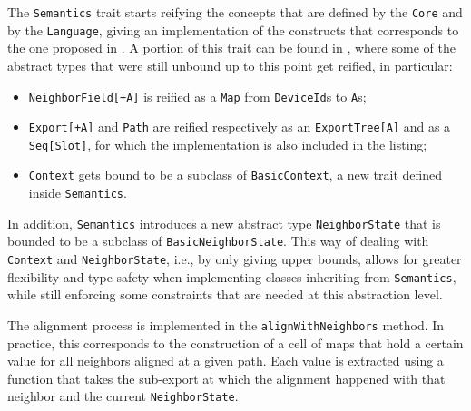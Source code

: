 The \texttt{Semantics} trait starts reifying the concepts that are defined by the \texttt{Core} and by the \texttt{Language}, giving an implementation of the constructs that corresponds to the one proposed in .
%
A portion of this trait can be found in , where some of the abstract types that were still unbound up to this point get reified, in particular:
%
\begin{itemize}
    \item \texttt{NeighborField[+A]} is reified as a \texttt{Map} from \texttt{DeviceId}s to \texttt{A}s;
    \item \texttt{Export[+A]} and \texttt{Path} are reified respectively as an \texttt{ExportTree[A]} and as a \texttt{Seq[Slot]}, for which the implementation is also included in the listing;
    \item \texttt{Context} gets bound to be a subclass of \texttt{BasicContext}, a new trait defined inside \texttt{Semantics}.
\end{itemize}
%
In addition, \texttt{Semantics} introduces a new abstract type \texttt{NeighborState} that is bounded to be a subclass of \texttt{BasicNeighborState}.
%
This way of dealing with \texttt{Context} and \texttt{NeighborState}, i.e., by only giving upper bounds, allows for greater flexibility and type safety when implementing classes inheriting from \texttt{Semantics}, while still enforcing some constraints that are needed at this abstraction level.
%


The alignment process is implemented in the \texttt{alignWithNeighbors} method.
%
In practice, this corresponds to the construction of a cell of maps that hold a certain value for all neighbors aligned at a given path.
%
Each value is extracted using a function that takes the sub-export at which the alignment happened with that neighbor and the current \texttt{NeighborState}.

